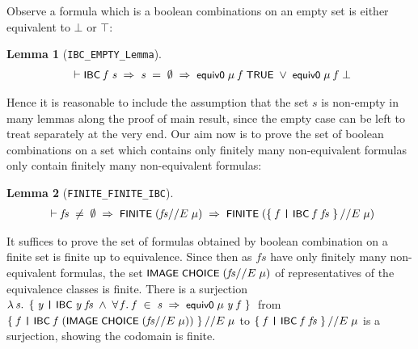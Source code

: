 \documentclass[letterpaper]{article}
\newtheorem{lm}{Lemma}
\renewcommand{\HOLConst}[1]{{\textsf{\upshape\small #1}}}
\renewcommand{\HOLinline}[1]{\ensuremath{#1}}
\newenvironment{holmath}{\begin{displaymath}\begin{array}{l}}{\end{array}\end{displaymath}\ignorespacesafterend}
\begin{document}
Observe a formula which is a boolean combinations on an empty set is either equivalent to $\bot$ or $\top$:
\begin{lm}[\texttt{IBC_EMPTY_Lemma}]
\begin{holmath}
  \ensuremath{\HOLTokenTurnstile}\HOLConst{IBC}\;\HOLFreeVar{f}\;\HOLFreeVar{s}\;\HOLSymConst{\HOLTokenImp{}}\;\HOLFreeVar{s}\;\HOLSymConst{=}\;\HOLSymConst{\HOLTokenEmpty{}}\;\HOLSymConst{\HOLTokenImp{}}\;\HOLConst{equiv0}\;\HOLFreeVar{\ensuremath{\mu}}\;\HOLFreeVar{f}\;\HOLConst{TRUE}\;\HOLSymConst{\HOLTokenDisj{}}\;\HOLConst{equiv0}\;\HOLFreeVar{\ensuremath{\mu}}\;\HOLFreeVar{f}\;\HOLSymConst{\ensuremath{\bot}}
\end{holmath}
\end{lm}

Hence it is reasonable to include the assumption that the set $s$ is non-empty in many lemmas along the proof of main result, since the empty case can be left to treat separately at the very end. Our aim now is to prove the set of boolean combinations on a set which contains only finitely many non-equivalent formulas only contain finitely many non-equivalent formulas:

\begin{lm}[\texttt{FINITE_FINITE_IBC}]
\begin{holmath}
  \ensuremath{\HOLTokenTurnstile}\HOLFreeVar{fs}\;\HOLSymConst{\HOLTokenNotEqual{}}\;\HOLSymConst{\HOLTokenEmpty{}}\;\HOLSymConst{\HOLTokenImp{}}\;\HOLConst{FINITE}\;(\HOLFreeVar{fs}\HOLSymConst{//E}\;\HOLFreeVar{\ensuremath{\mu}})\;\HOLSymConst{\HOLTokenImp{}}\;\HOLConst{FINITE}\;(\HOLTokenLeftbrace{}\HOLBoundVar{f}\;\HOLTokenBar{}\;\HOLConst{IBC}\;\HOLBoundVar{f}\;\HOLFreeVar{fs}\HOLTokenRightbrace{}\HOLSymConst{//E}\;\HOLFreeVar{\ensuremath{\mu}})
\end{holmath}
\end{lm}

It suffices to prove the set of formulas obtained by boolean combination on a finite set is finite up to equivalence. Since then as $fs$ have only finitely many non-equivalent formulas, the set \HOLinline{\HOLConst{IMAGE}\;\HOLConst{CHOICE}\;(\HOLFreeVar{fs}\HOLSymConst{//E}\;\HOLFreeVar{\ensuremath{\mu}})} of representatives of the equivalence classes is finite. There is a surjection \HOLinline{\HOLTokenLambda{}\HOLBoundVar{s}.\;\HOLTokenLeftbrace{}\HOLBoundVar{y}\;\HOLTokenBar{}\;\HOLConst{IBC}\;\HOLBoundVar{y}\;\HOLFreeVar{fs}\;\HOLSymConst{\HOLTokenConj{}}\;\HOLSymConst{\HOLTokenForall{}}\HOLBoundVar{f}.\;\HOLBoundVar{f}\;\HOLSymConst{\HOLTokenIn{}}\;\HOLBoundVar{s}\;\HOLSymConst{\HOLTokenImp{}}\;\HOLConst{equiv0}\;\HOLFreeVar{\ensuremath{\mu}}\;\HOLBoundVar{y}\;\HOLBoundVar{f}\HOLTokenRightbrace{}} from 
\HOLinline{\HOLTokenLeftbrace{}\HOLBoundVar{f}\;\HOLTokenBar{}\;\HOLConst{IBC}\;\HOLBoundVar{f}\;(\HOLConst{IMAGE}\;\HOLConst{CHOICE}\;(\HOLFreeVar{fs}\HOLSymConst{//E}\;\HOLFreeVar{\ensuremath{\mu}}))\HOLTokenRightbrace{}\HOLSymConst{//E}\;\HOLFreeVar{\ensuremath{\mu}}} to \HOLinline{\HOLTokenLeftbrace{}\HOLBoundVar{f}\;\HOLTokenBar{}\;\HOLConst{IBC}\;\HOLBoundVar{f}\;\HOLFreeVar{fs}\HOLTokenRightbrace{}\HOLSymConst{//E}\;\HOLFreeVar{\ensuremath{\mu}}} is a surjection, showing the codomain is finite. 
\end{document}
